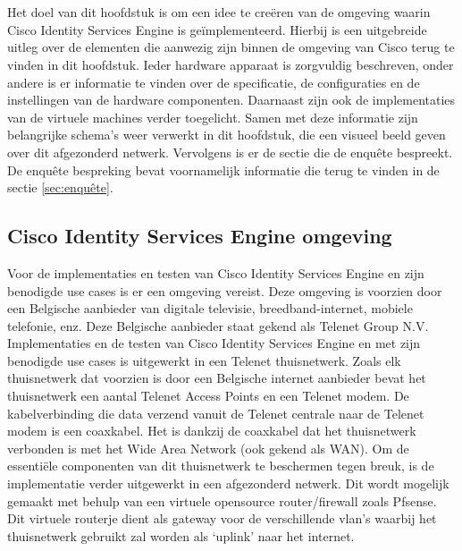 
\chapter{}
\label{ch:Proof of concept}

Het doel van dit hoofdstuk is om een idee te creëren van de omgeving waarin Cisco Identity Services Engine is geïmplementeerd. Hierbij is een uitgebreide uitleg over de elementen die aanwezig zijn binnen de omgeving van Cisco terug te vinden in dit hoofdstuk. Ieder hardware apparaat is zorgvuldig beschreven, onder andere is er informatie te vinden over de specificatie, de configuraties en de instellingen van de hardware componenten. Daarnaast zijn ook de implementaties van de virtuele machines verder toegelicht.
\newline
\newline
Samen met deze informatie zijn belangrijke schema’s weer verwerkt in dit hoofdstuk, die een visueel beeld geven over dit afgezonderd netwerk. 
Vervolgens is er de sectie die de enquête bespreekt. De enquête bespreking bevat voornamelijk informatie die terug te vinden in de sectie \ref{sec:enquête}. 

\section{Cisco Identity Services Engine omgeving}

Voor de implementaties en testen van Cisco Identity Services Engine en zijn benodigde use cases is er een omgeving vereist. Deze omgeving is voorzien door een Belgische aanbieder van digitale televisie, breedband-internet, mobiele telefonie, enz. Deze Belgische aanbieder staat gekend als Telenet Group N.V. Implementaties en de testen van Cisco Identity Services Engine en met zijn benodigde use cases is uitgewerkt in een Telenet thuisnetwerk.
\newline
Zoals elk thuisnetwerk dat voorzien is door een Belgische internet aanbieder bevat het thuisnetwerk een aantal Telenet Access Points en een Telenet modem. De kabelverbinding die data verzend vanuit de Telenet centrale naar de Telenet modem is een coaxkabel. Het is dankzij de coaxkabel dat het thuisnetwerk verbonden is met het Wide Area Network (ook gekend als WAN).
\newline
\newline
Om de essentiële componenten van dit thuisnetwerk te beschermen tegen breuk, is de implementatie verder uitgewerkt in een afgezonderd netwerk. Dit wordt mogelijk gemaakt met behulp van een virtuele opensource router/firewall zoals Pfsense. Dit virtuele routerje dient als gateway voor de verschillende vlan’s waarbij het thuisnetwerk gebruikt zal worden als ‘uplink’ naar het internet. 

